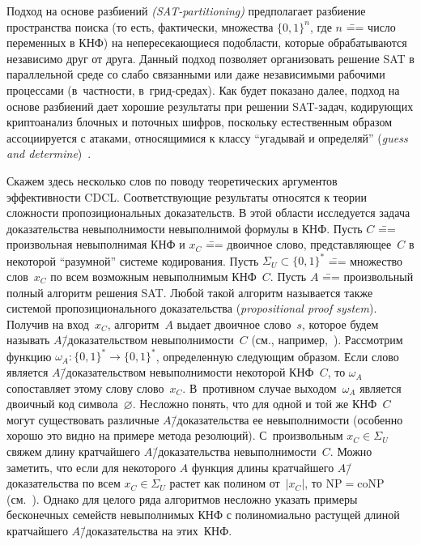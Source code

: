 Подход на основе разбиений \textit{(SAT-partitioning)} предполагает разбиение пространства поиска (то есть, фактически, множества $\{ 0,1 \}^{n}$, где $n$ \=== число переменных в КНФ) на непересекающиеся подобласти, которые обрабатываются независимо друг от друга.
Данный подход позволяет организовать решение SAT в параллельной среде со слабо связанными или даже независимыми рабочими процессами (в~частности, в~грид-средах).
Как будет показано далее, подход на основе разбиений дает хорошие результаты при решении SAT-задач, кодирующих криптоанализ блочных и поточных шифров, поскольку естественным образом ассоциируется с атаками, относящимися к классу \enquote{угадывай и определяй} (\textit{guess and determine})~\cite{bard2009}.

Скажем здесь несколько слов по поводу теоретических аргументов эффективности CDCL.
Соответствующие результаты относятся к теории сложности пропозициональных доказательств.
В этой области исследуется задача доказательства невыполнимости невыполнимой формулы в КНФ.
Пусть $C$ \=== произвольная невыполнимая КНФ и $x_{C}$ \=== двоичное слово, представляющее~$C$ в некоторой \enquote{разумной} системе кодирования.
Пусть $\Sigma_{U} \subset \{ 0,1 \}^{*}$ \=== множество слов~$x_{C}$ по всем возможным невыполнимым КНФ~$C$.
Пусть $A$ \=== произвольный полный алгоритм решения SAT.
Любой такой алгоритм называется также системой пропозиционального доказательства (\textit{propositional proof system}).
Получив на вход~$x_{C}$, алгоритм~$A$ выдает двоичное слово~$s$, которое будем называть $A$\=/доказательством невыполнимости~$C$ (см., например,~\cite{razborov2002}).
Рассмотрим функцию $\omega_{A} \colon \{ 0,1 \}^{*} \to \{ 0,1 \}^{*}$, определенную следующим образом.
Если слово является $A$\=/доказательством невыполнимости некоторой КНФ~$C$, то $\omega_{A}$ сопоставляет этому слову слово~$x_{C}$.
В~противном случае выходом~$\omega_{A}$ является двоичный код символа~$\varnothing$.
Несложно понять, что для одной и той же КНФ~$C$ могут существовать различные $A$\=/доказательства ее невыполнимости (особенно хорошо это видно на примере метода резолюций).
С~произвольным $x_{C} \in \Sigma_{U}$ свяжем длину кратчайшего $A$\=/доказательства невыполнимости~$C$.
Можно заметить, что если для некоторого $A$ функция длины кратчайшего $A$\=/доказательства по всем $x_{C} \in \Sigma_{U}$ растет как полином от~$|x_{C}|$, то $\mathrm{NP} = \mathrm{coNP}$ (см.~\cite{cook1979}).
Однако для целого ряда алгоритмов несложно указать примеры бесконечных семейств невыполнимых КНФ с полиномиально растущей длиной кратчайшего $A$\=/доказательства на этих~КНФ.

